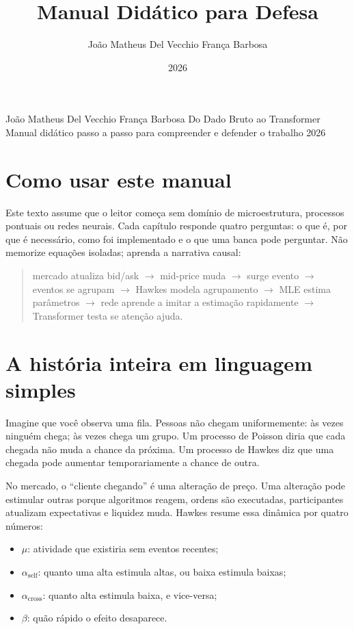 \documentclass[12pt,a4paper,openany]{report}
\title{Manual Didático para Defesa}
\author{João Matheus Del Vecchio França Barbosa}
\date{2026}
\begin{document}
\tgtitlepage
  {João Matheus Del Vecchio França Barbosa}
  {Do Dado Bruto ao Transformer}
  {Manual didático passo a passo para compreender e defender o trabalho}
  {2026}

\chapter*{Como usar este manual}

Este texto assume que o leitor começa sem domínio de microestrutura, processos
pontuais ou redes neurais. Cada capítulo responde quatro perguntas: o que é, por que
é necessário, como foi implementado e o que uma banca pode perguntar. Não memorize
equações isoladas; aprenda a narrativa causal:

\begin{quote}
mercado atualiza bid/ask \(\rightarrow\) mid-price muda \(\rightarrow\) surge evento
\(\rightarrow\) eventos se agrupam \(\rightarrow\) Hawkes modela agrupamento
\(\rightarrow\) MLE estima parâmetros \(\rightarrow\) rede aprende a imitar a
estimação rapidamente \(\rightarrow\) Transformer testa se atenção ajuda.
\end{quote}

\tableofcontents
\clearpage
{}

\chapter{A história inteira em linguagem simples}

Imagine que você observa uma fila. Pessoas não chegam uniformemente: às vezes ninguém
chega; às vezes chega um grupo. Um processo de Poisson diria que cada chegada não muda
a chance da próxima. Um processo de Hawkes diz que uma chegada pode aumentar
temporariamente a chance de outra.

No mercado, o ``cliente chegando'' é uma alteração de preço. Uma alteração pode
estimular outras porque algoritmos reagem, ordens são executadas, participantes
atualizam expectativas e liquidez muda. Hawkes resume essa dinâmica por quatro números:
\begin{itemize}
  \item \(\mu\): atividade que existiria sem eventos recentes;
  \item \(\alpha_{\mathrm{self}}\): quanto uma alta estimula altas, ou baixa estimula baixas;
  \item \(\alpha_{\mathrm{cross}}\): quanto alta estimula baixa, e vice-versa;
  \item \(\beta\): quão rápido o efeito desaparece.
\end{itemize}
\end{document}
